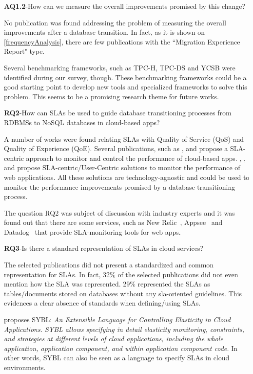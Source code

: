 \documentclass[a4paper]{IEEEtran}
\begin{document}
\bigskip
\noindent\textbf{AQ1.2}-How can we measure the overall improvements promised by this change?

No publication was found addressing the problem of measuring the overall improvements after a database transition. In fact, as it is shown on \ref{frequencyAnalysis}, there are few publications with the ``Migration Experience Report"  type. 

Several benchmarking frameworks, such as TPC-H, TPC-DS and YCSB were identified\cite{6616442} during our survey, though. These benchmarking frameworks could be a good starting point to develop new tools and specialized frameworks to solve this problem. This seems to be a promising research theme for future works.

\bigskip
\noindent\textbf{RQ2}-How can SLAs be used to guide database transitioning processes from RDBMSs to NoSQL databases in cloud-based apps?

A number of works were found relating SLAs with Quality of Service (QoS) and Quality of Experience (QoE). Several publications, such as \cite{Xiong:2012:DMR:2213598.2213614}, \cite{Konstantinou:2012:TEN:2213836.2213943} and \cite{Klems:2012:RQM:2477172.2477488} propose a SLA-centric approach to monitor and control the performance of cloud-based apps. 
\cite{6253526}, \cite{6461875}, \cite{6511780} and \cite{Xiong:2011:APA:2038916.2038931} propose SLA-centric/User-Centric solutions to monitor the performance of web applications. All these solutions are technology-agnostic and could be used to monitor the performance improvements promised by a database transitioning process.

The question RQ2 was subject of discussion with industry experts and it was found out that there are some services, such as New Relic~\cite{newrelic}, Appsee~\cite{appsee} and Datadog~\cite{datadog} that provide SLA-monitoring tools for web apps.

\bigskip
\noindent\textbf{RQ3}-Is there a standard representation of SLAs in cloud services? 

The selected publications did not present a standardized and common representation for SLAs. In fact, 32\% of the selected publications did not even mention how the SLA was represented. 29\% represented the SLAs as tables/documents stored on databases without any sla-oriented guidelines. This evidences a clear absence of standards when defining/using SLAs.

\cite{6546068} proposes SYBL: \textit{An Extensible Language for Controlling Elasticity in Cloud Applications. SYBL allows specifying in detail elasticity monitoring, constraints, and strategies at different levels of cloud applications, including the whole application, application component, and within application component code.} In other words, SYBL can also be seen as a language to specify SLAs in cloud environments.  
\end{document}
